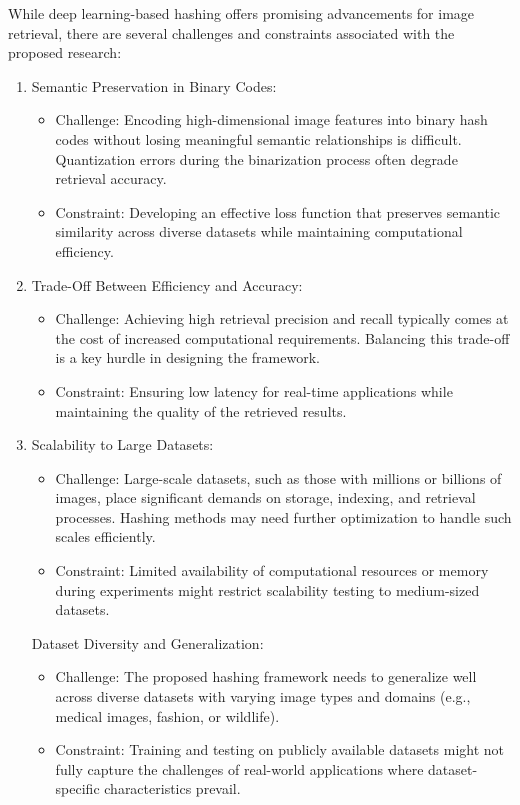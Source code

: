 \documentclass[conference]{IEEEtran}
\begin{document}
While deep learning-based hashing offers promising advancements for image retrieval, there are several challenges and constraints associated with the proposed research:
\begin{enumerate}
    \item Semantic Preservation in Binary Codes:
\begin{itemize}
    \item     Challenge: Encoding high-dimensional image features into binary hash codes without losing meaningful semantic relationships is difficult. Quantization errors during the binarization process often degrade retrieval accuracy.
    \item    Constraint: Developing an effective loss function that preserves semantic similarity across diverse datasets while maintaining computational efficiency.
    
\end{itemize}    
    \item Trade-Off Between Efficiency and Accuracy:

    \begin{itemize}
        \item Challenge: Achieving high retrieval precision and recall typically comes at the cost of increased computational requirements. Balancing this trade-off is a key hurdle in designing the framework.
        \item Constraint: Ensuring low latency for real-time applications while maintaining the quality of the retrieved results.
    \end{itemize}

    \item Scalability to Large Datasets:

\begin{itemize}
    \item     Challenge: Large-scale datasets, such as those with millions or billions of images, place significant demands on storage, indexing, and retrieval processes. Hashing methods may need further optimization to handle such scales efficiently.
    \item     Constraint: Limited availability of computational resources or memory during experiments might restrict scalability testing to medium-sized datasets.
    
\end{itemize}    

Dataset Diversity and Generalization:
    \begin{itemize}
        \item Challenge: The proposed hashing framework needs to generalize well across diverse datasets with varying image types and domains (e.g., medical images, fashion, or wildlife).
        \item Constraint: Training and testing on publicly available datasets might not fully capture the challenges of real-world applications where dataset-specific characteristics prevail.
    

\end{itemize}
\end{enumerate}
\end{document}
